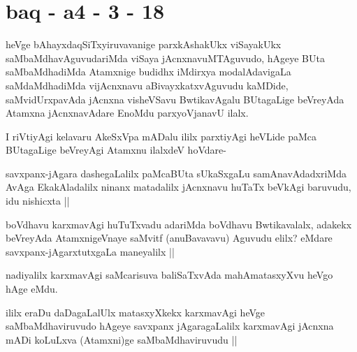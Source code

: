 \section*{baq - a4 - 3 - 18}


\begin{artha}
heVge bAhayxdaqSiTxyiruvavanige parxkAshakUkx viSayakUkx saMbaMdhavAguvudariMda viSaya jAcnxnavuMTAguvudo, hAgeye BUta saMbaMdhadiMda Atamxnige budidhx iMdirxya modalAdavigaLa saMdaMdhadiMda vijAcnxnavu aBivayxkatxvAguvudu kaMDide, saMvidUrxpavAda jAcnxna visheVSavu BwtikavAgalu BUtagaLige beVreyAda Atamxna jAcnxnavAdare EnoMdu parxyoVjanavU ilalx.
\end{artha}


\begin{artha}
I riVtiyAgi kelavaru AkeSxVpa mADalu ililx parxtiyAgi heVLide paMca BUtagaLige beVreyAgi Atamxnu ilalxdeV hoVdare-
\end{artha}

\begin{artha}
savxpanx-jAgara dashegaLalilx paMcaBUta sUkaSxgaLu samAnavAdadxriMda 
AvAga EkakAladalilx ninanx matadalilx jAcnxnavu huTaTx beVkAgi baruvudu, idu nishicxta ||
\end{artha}


\begin{artha}
boVdhavu karxmavAgi huTuTxvadu adariMda boVdhavu Bwtikavalalx, adakekx beVreyAda AtamxnigeVnaye saMvitf (anuBavavavu) Aguvudu elilx? eMdare savxpanx-jAgarxtutxgaLa maneyalilx ||
\end{artha}


\begin{artha}
nadiyalilx karxmavAgi saMcarisuva baliSaTxvAda mahAmatasxyXvu heVgo hAge eMdu.
\end{artha}

\begin{artha}
ililx eraDu daDagaLalUlx matasxyXkekx karxmavAgi heVge saMbaMdhaviruvudo hAgeye savxpanx jAgaragaLalilx karxmavAgi jAcnxna mADi koLuLxva (Atamxni)ge saMbaMdhaviruvudu ||
\end{artha}


